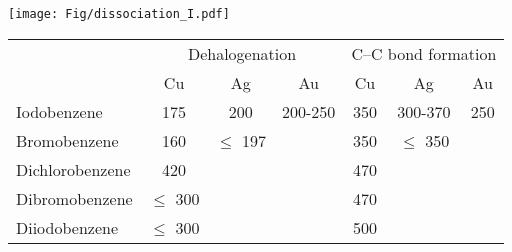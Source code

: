 \documentclass[aps,prl,reprint,amsmath,amssymb,floatfix,notitlepage]{revtex4-1}
\begin{document}
\begin{figure*}[hbt]
\centering
\texttt{[image: Fig/dissociation\_I.pdf]}
\caption{Dissociation of the C--I bond on Cu(111). The energy diagram shows the NEB profile of the deiodination process. In the structural images, orange, cyan, white, purple spheres represent copper, carbon, hydrogen, iodine atoms, respectively.}
\label{fig:dissociation_I}
\end{figure*}

\begin{table*}
\centering\caption{Minimum experemental temperatures (\si{\kelvin}) necessary for the completion of the two key Ullmann compling steps.}
\begin{tabular}{ lcccccc }
 \hline
 \hline
  & \multicolumn{3}{c}{Dehalogenation} & \multicolumn{3}{c}{C--C bond formation} \\
  &\multicolumn{1}{c}{Cu} &\multicolumn{1}{c}{Ag} & \multicolumn{1}{c}{Au} & \multicolumn{1}{c}{Cu} &\multicolumn{1}{c}{Ag} &\multicolumn{1}{c}{Au}\\
 \hline
 Iodobenzene             &175\cite{sur_sci01} &200\cite{sur_sci02} &200-250\cite{sur_sci03} &350\cite{ullmann_68} &300-370\cite{ullmann_68} &250\cite{sur_sci03}\\
 Bromobenzene  &160\cite{ullmann_67} &$\leq$ 197\cite{sur_sci02}  &  &350\cite{ullmann_67}  &$\leq$ 350\cite{sur_sci02}  & \\
 Dichlorobenzene &420\cite{ullmann_52} & & &470\cite{ullmann_52} & & \\
 Dibromobenzene &$\leq$ 300\cite{ullmann_52} & & &470\cite{ullmann_98}  & & \\
 Diiodobenzene &$\leq$ 300\cite{ullmann_52} & & &500 \cite{ullmann_88} & & \\
 \hline
 \hline
\end{tabular}
\label{table:experimental-temperatures}
\end{table*}
\end{document}
